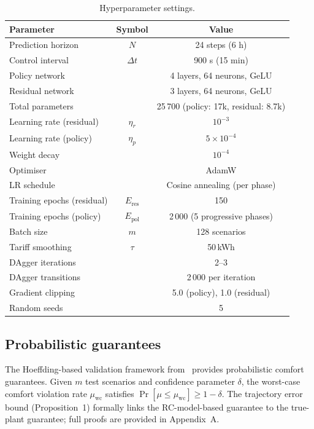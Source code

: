 \documentclass[12pt]{article}
\theoremstyle{plain}
\theoremstyle{definition}
\begin{document}
\begin{table}[H]
\centering
\caption{Hyperparameter settings.}\label{tab:hyperparams}
\begin{tabular*}{\textwidth}{@{\extracolsep{\fill}}lcc}
\toprule
Parameter & Symbol & Value \\
\midrule
Prediction horizon & $N$ & 24 steps (6 h) \\
Control interval & $\Delta t$ & 900 s (15 min) \\
Policy network & & 4 layers, 64 neurons, GeLU \\
Residual network & & 3 layers, 64 neurons, GeLU \\
Total parameters & & 25\,700 (policy: 17k, residual: 8.7k) \\
Learning rate (residual) & $\eta_r$ & $10^{-3}$ \\
Learning rate (policy) & $\eta_p$ & $5 \times 10^{-4}$ \\
Weight decay & & $10^{-4}$ \\
Optimiser & & AdamW \\
LR schedule & & Cosine annealing (per phase) \\
Training epochs (residual) & $E_{\text{res}}$ & 150 \\
Training epochs (policy) & $E_{\text{pol}}$ & 2\,000 (5 progressive phases) \\
Batch size & $m$ & 128 scenarios \\
Tariff smoothing & $\tau$ & 50\,kWh \\
DAgger iterations & & 2--3 \\
DAgger transitions & & 2\,000 per iteration \\
Gradient clipping & & 5.0 (policy), 1.0 (residual) \\
Random seeds & & 5 \\
\bottomrule
\end{tabular*}
\end{table}

\subsection{Probabilistic guarantees}

The Hoeffding-based validation framework from~\cite{drgona2024dpc,hertneck2018approximate,karg2021probabilistic} provides probabilistic comfort guarantees. Given $m$ test scenarios and confidence parameter $\delta$, the worst-case comfort violation rate $\mu_{\text{wc}}$ satisfies $\Pr[\mu \leq \mu_{\text{wc}}] \geq 1 - \delta$. The trajectory error bound (Proposition~1) formally links the RC-model-based guarantee to the true-plant guarantee; full proofs are provided in Appendix~A.
\end{document}
